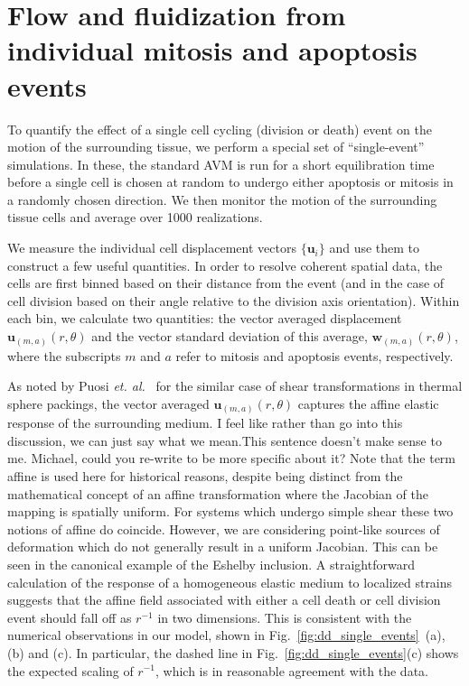 \documentclass[
reprint
,aps
,amssymb
,amsmath
,superscriptaddress
]{revtex4-1}
\newcommand{\mdc}[1]{{\color{blue}#1}}
\newcommand{\lisa}[1]{{\color{red}#1}}
\newcommand{\dms}[1]{{\color{magenta}#1}}
\begin{document}

\section{Flow and fluidization from individual mitosis and apoptosis events \label{sec:dd_single_events}}

To quantify the effect of a single cell cycling (division or death) event on the motion of the surrounding tissue, we perform a special set of ``single-event'' simulations. In these, the standard AVM is run for a short equilibration time before a single cell is chosen at random to undergo either apoptosis or mitosis in a randomly chosen direction. We then monitor the motion of the surrounding tissue cells and average over 1000 realizations. 

We measure the individual cell displacement vectors $\{ \mathbf{u}_i \}$ and use them to construct a few useful quantities. In order to resolve coherent spatial data, the cells are first binned based on their distance from the event (and in the case of cell division based on their angle relative to the division axis orientation). Within each bin, we calculate two quantities: the vector averaged displacement $\mathbf{u}_{(m,a)}(r, \theta)$ and the vector standard deviation of this average, $\bm{w}_{(m,a)}(r, \theta)$, where the subscripts $m$ and $a$ refer to mitosis and apoptosis events, respectively. 

As noted by Puosi \textit{et. al.}~\cite{Puosi2014} for the similar case of shear transformations in thermal sphere packings, the vector averaged $\mathbf{u}_{(m,a)}(r, \theta)$ captures the affine elastic response of the surrounding medium. \dms{I feel like rather than go into this discussion, we can just say what we mean.}\lisa{This sentence doesn't make sense to me. Michael, could you re-write to be more specific about it? Note that the term affine is used here for historical reasons, despite being distinct from the mathematical concept of an affine transformation} \mdc{where the Jacobian of the mapping is spatially uniform. For systems which undergo simple shear these two notions of affine do coincide. However, we are considering point-like sources of deformation which do not generally result in a uniform Jacobian. This can be seen in the canonical example of the Eshelby inclusion.} A straightforward calculation of the response of a homogeneous elastic medium to localized strains~\cite{Puosi2014} suggests that the affine field associated with either a cell death or cell division event should fall off as $r^{-1}$ in two dimensions. This is consistent with the numerical observations in our model, shown in Fig.~\ref{fig:dd_single_events}~(a), (b) and (c). In particular, the dashed line in Fig.~\ref{fig:dd_single_events}(c) shows the expected scaling of $r^{-1}$, which is in reasonable agreement with the data. 
\end{document}
